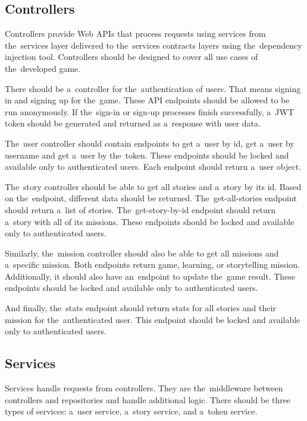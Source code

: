 \subsection{Controllers}

Controllers provide Web APIs that process requests using services from the~services layer delivered to the~services contracts layers using the~dependency injection tool.
Controllers should be designed to cover all use cases of the~developed game.

There should be a~controller for the~authentication of users.
That means signing in and signing up for the~game.
These API endpoints should be allowed to be run anonymously.
If the~sign-in or sign-up processes finish successfully, a~JWT token should be generated and returned as a~response with user data.

The~user controller should contain endpoints to get a~user by id, get a~user by username and get a~user by the~token.
These endpoints should be locked and available only to authenticated users.
Each endpoint should return a~user object.

The~story controller should be able to get all stories and a~story by its id.
Based on the~endpoint, different data should be returned.
The~get-all-stories endpoint should return a~list of stories.
The~get-story-by-id endpoint should return a~story with all of its missions.
These endpoints should be locked and available only to authenticated users.

Similarly, the~mission controller should also be able to get all missions and a~specific mission.
Both endpoints return game, learning, or storytelling mission.
Additionally, it should also have an~endpoint to update the~game result.
These endpoints should be locked and available only to authenticated users.

And finally, the~stats endpoint should return stats for all stories and their mission for the~authenticated user.
This endpoint should be locked and available only to authenticated users.

\subsection{Services}

Services handle requests from controllers.
They are the~middleware between controllers and repositories and handle additional logic.
There should be three types of services: a~user service, a~story service, and a~token service.

